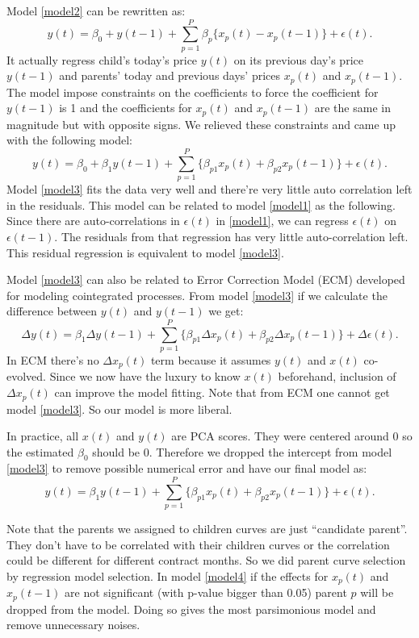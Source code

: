 \documentclass[12pt]{article}
\begin{document}
Model \ref{model2} can be rewritten as:
\[ y(t)=\beta_0 + y(t-1) + \sum_{p=1}^P \beta_p \{x_p(t)-x_{p}(t-1)\} + \epsilon(t). \]
It actually regress child's today's price $y(t)$ on 
its previous day's price $y(t-1)$ and parents' today
and previous days' prices $x_p(t)$ and $x_p(t-1)$.
The model impose constraints on the coefficients to
force the coefficient for $y(t-1)$ is 1 and 
the coefficients for $x_p(t)$ and $x_p(t-1)$ are
the same in magnitude but with opposite signs.
We relieved these constraints and came up with the following model:
\begin{equation}
  y(t)=\beta_0 + \beta_1 y(t-1) + 
\sum_{p=1}^P \{\beta_{p1} x_p(t) + \beta_{p2} x_p(t-1) \} + \epsilon(t). 
\label{model3}
\end{equation}
Model \ref{model3} fits the data very well and there're very 
little  auto correlation
left in the residuals.
This model can be related to model \ref{model1} as the following. 
Since there are auto-correlations in $\epsilon(t)$ in \ref{model1}, 
we can regress $\epsilon(t)$ on $\epsilon(t-1)$. The residuals
from that regression has very little auto-correlation left. 
This residual regression is equivalent to model \ref{model3}.

Model \ref{model3}  can also be related to 
Error Correction Model (ECM) developed for modeling cointegrated
processes. From model \ref{model3} if we calculate the difference
between $y(t)$ and $y(t-1)$ we get:
\[\Delta y(t) = \beta_1 \Delta y(t-1) + 
\sum_{p=1}^P \{\beta_{p1} \Delta x_p(t) + \beta_{p2} \Delta x_p(t-1) \} + 
\Delta \epsilon(t). \]
In ECM there's no $\Delta x_p(t)$ term because it assumes 
$y(t)$ and $x(t)$ co-evolved. Since we now have the luxury to
know $x(t)$ beforehand, inclusion of $\Delta x_p(t)$ can
improve the model fitting. Note that from ECM one cannot get 
model \ref{model3}. So our model is more liberal.

In practice, all $x(t)$ and $y(t)$ are PCA scores. They
were centered around 0 so the estimated $\beta_0$
should be 0. Therefore we dropped the intercept from
model \ref{model3} to remove possible numerical error 
and have our final model as:
\begin{equation}
  y(t)=\beta_1 y(t-1) + 
\sum_{p=1}^P \{\beta_{p1} x_p(t) + \beta_{p2} x_p(t-1) \} + \epsilon(t). 
\label{model4}
\end{equation}

Note that the parents we assigned to children curves are just
``candidate parent''. They don't have to be correlated with their
children curves or the correlation could be different for different
contract months.
So we did parent curve selection by regression model selection.
In model \ref{model4} if the effects for $x_p(t)$ and $x_p(t-1)$
are not significant (with p-value bigger than 0.05) parent $p$ 
will be dropped from the model. Doing so gives the most
parsimonious model and remove unnecessary noises. 
\end{document}
